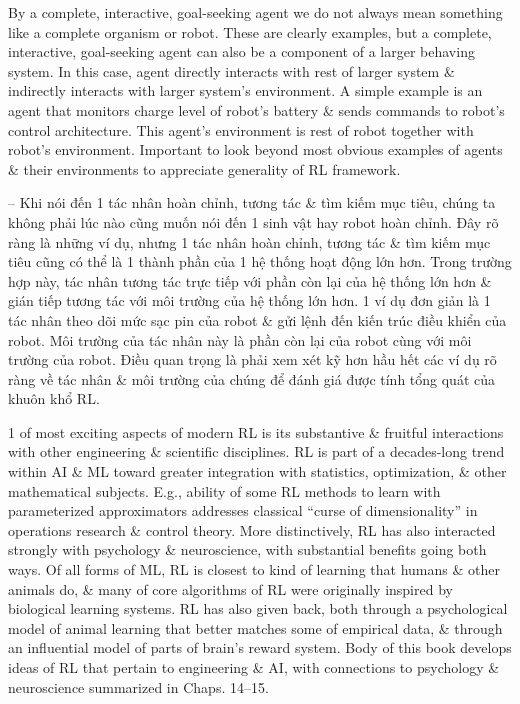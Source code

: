 \documentclass{article}
\begin{document}
\begin{itemize}
\begin{itemize}
        By a complete, interactive, goal-seeking agent we do not always mean something like a complete organism or robot. These are clearly examples, but a complete, interactive, goal-seeking agent can also be a component of a larger behaving system. In this case, agent directly interacts with rest of larger system \& indirectly interacts with larger system's environment. A simple example is an agent that monitors charge level of robot's battery \& sends commands to robot's control architecture. This agent's environment is rest of robot together with robot's environment. Important to look beyond most obvious examples of agents \& their environments to appreciate generality of RL framework.

        -- Khi nói đến 1 tác nhân hoàn chỉnh, tương tác \& tìm kiếm mục tiêu, chúng ta không phải lúc nào cũng muốn nói đến 1 sinh vật hay robot hoàn chỉnh. Đây rõ ràng là những ví dụ, nhưng 1 tác nhân hoàn chỉnh, tương tác \& tìm kiếm mục tiêu cũng có thể là 1 thành phần của 1 hệ thống hoạt động lớn hơn. Trong trường hợp này, tác nhân tương tác trực tiếp với phần còn lại của hệ thống lớn hơn \& gián tiếp tương tác với môi trường của hệ thống lớn hơn. 1 ví dụ đơn giản là 1 tác nhân theo dõi mức sạc pin của robot \& gửi lệnh đến kiến trúc điều khiển của robot. Môi trường của tác nhân này là phần còn lại của robot cùng với môi trường của robot. Điều quan trọng là phải xem xét kỹ hơn hầu hết các ví dụ rõ ràng về tác nhân \& môi trường của chúng để đánh giá được tính tổng quát của khuôn khổ RL.

        1 of most exciting aspects of modern RL is its substantive \& fruitful interactions with other engineering \& scientific disciplines. RL is part of a decades-long trend within AI \& ML toward greater integration with statistics, optimization, \& other mathematical subjects. E.g., ability of some RL methods to learn with parameterized approximators addresses classical ``curse of dimensionality'' in operations research \& control theory. More distinctively, RL has also interacted strongly with psychology \& neuroscience, with substantial benefits going both ways. Of all forms of ML, RL is closest to kind of learning that humans \& other animals do, \& many of core algorithms of RL were originally inspired by biological learning systems. RL has also given back, both through a psychological model of animal learning that better matches some of empirical data, \& through an influential model of parts of brain's reward system. Body of this book develops ideas of RL that pertain to engineering \& AI, with connections to psychology \& neuroscience summarized in Chaps. 14--15.


\end{itemize}
\end{itemize}
\end{document}
